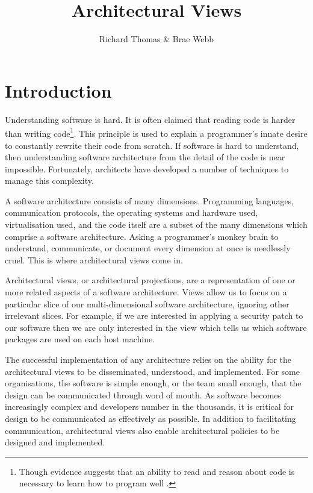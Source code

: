 \title{Architectural Views}
\author{Richard Thomas \& Brae Webb}
\date{}

\maketitle

\section{Introduction}

Understanding software is hard.
It is often claimed that reading code is harder than writing code\footnote{Though evidence suggests that an ability to read and reason 
about code is necessary to learn how to program well \cite{lister-tracing-explaining-writing} \cite{lister-neo-piagetian}.}.
This principle is used to explain a programmer's innate desire to constantly rewrite their code from scratch.
If software is hard to understand, then understanding software architecture from the detail of the code is near impossible.
Fortunately, architects have developed a number of techniques to manage this complexity.

A software architecture consists of many dimensions.
Programming languages, communication protocols, the operating systems and hardware used, virtualisation used,
and the code itself are a subset of the many dimensions which comprise a software architecture.
Asking a programmer's monkey brain to understand, communicate, or document every dimension at once is needlessly cruel.
This is where architectural views come in.

Architectural views, or architectural projections, are a representation of one or more related aspects of a software architecture.
Views allow us to focus on a particular slice of our multi-dimensional software architecture, ignoring other irrelevant slices.
For example, if we are interested in applying a security patch to our software then we are only interested in the view
which tells us which software packages are used on each host machine.

The successful implementation of any architecture relies on the ability for the architectural views
to be disseminated, understood, and implemented.
For some organisations, the software is simple enough, or the team small enough, that the design
can be communicated through word of mouth.
As software becomes increasingly complex and developers number in the thousands,
it is critical for design to be communicated as effectively as possible.
In addition to facilitating communication,
architectural views also enable architectural policies to be designed and implemented.


